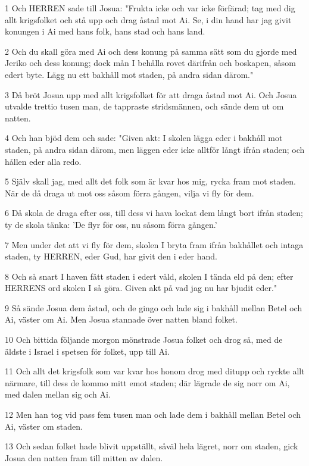 \par 1 Och HERREN sade till Josua: "Frukta icke och var icke förfärad; tag med dig allt krigsfolket och stå upp och drag åstad mot Ai. Se, i din hand har jag givit konungen i Ai med hans folk, hans stad och hans land.
\par 2 Och du skall göra med Ai och dess konung på samma sätt som du gjorde med Jeriko och dess konung; dock mån I behålla rovet därifrån och boskapen, såsom edert byte. Lägg nu ett bakhåll mot staden, på andra sidan därom."
\par 3 Då bröt Josua upp med allt krigsfolket för att draga åstad mot Ai. Och Josua utvalde trettio tusen man, de tappraste stridsmännen, och sände dem ut om natten.
\par 4 Och han bjöd dem och sade: "Given akt: I skolen lägga eder i bakhåll mot staden, på andra sidan därom, men läggen eder icke alltför långt ifrån staden; och hållen eder alla redo.
\par 5 Själv skall jag, med allt det folk som är kvar hos mig, rycka fram mot staden. När de då draga ut mot oss såsom förra gången, vilja vi fly för dem.
\par 6 Då skola de draga efter oss, till dess vi hava lockat dem långt bort ifrån staden; ty de skola tänka: 'De flyr för oss, nu såsom förra gången.'
\par 7 Men under det att vi fly för dem, skolen I bryta fram ifrån bakhållet och intaga staden, ty HERREN, eder Gud, har givit den i eder hand.
\par 8 Och så snart I haven fått staden i edert våld, skolen I tända eld på den; efter HERRENS ord skolen I så göra. Given akt på vad jag nu har bjudit eder."
\par 9 Så sände Josua dem åstad, och de gingo och lade sig i bakhåll mellan Betel och Ai, väster om Ai. Men Josua stannade över natten bland folket.
\par 10 Och bittida följande morgon mönstrade Josua folket och drog så, med de äldste i Israel i spetsen för folket, upp till Ai.
\par 11 Och allt det krigsfolk som var kvar hos honom drog med ditupp och ryckte allt närmare, till dess de kommo mitt emot staden; där lägrade de sig norr om Ai, med dalen mellan sig och Ai.
\par 12 Men han tog vid pass fem tusen man och lade dem i bakhåll mellan Betel och Ai, väster om staden.
\par 13 Och sedan folket hade blivit uppställt, såväl hela lägret, norr om staden, gick Josua den natten fram till mitten av dalen.
